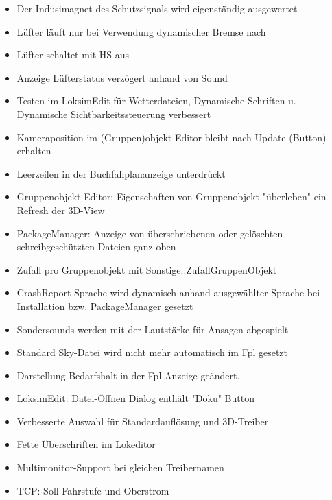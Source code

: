 \begin{itemize}
\itemsep1pt\parskip0pt
\item
  Der Indusimagnet des Schutzsignals wird eigenständig ausgewertet
\item
  Lüfter läuft nur bei Verwendung dynamischer Bremse nach
\item
  Lüfter schaltet mit HS aus
\item
  Anzeige Lüfterstatus verzögert anhand von Sound
\item
  Testen im LoksimEdit für Wetterdateien, Dynamische Schriften u.
  Dynamische Sichtbarkeitssteuerung verbessert
\item
  Kameraposition im (Gruppen)objekt-Editor bleibt nach Update-(Button)
  erhalten
\item
  Leerzeilen in der Buchfahplananzeige unterdrückt
\item
  Gruppenobjekt-Editor: Eigenschaften von Gruppenobjekt "überleben" ein
  Refresh der 3D-View
\item
  PackageManager: Anzeige von überschriebenen oder gelöschten
  schreibgeschützten Dateien ganz oben
\item
  Zufall pro Gruppenobjekt mit Sonstige::ZufallGruppenObjekt
\item
  CrashReport Sprache wird dynamisch anhand ausgewählter Sprache bei
  Installation bzw. PackageManager gesetzt
\item
  Sondersounds werden mit der Lautstärke für Ansagen abgespielt
\item
  Standard Sky-Datei wird nicht mehr automatisch im Fpl gesetzt
\item
  Darstellung Bedarfshalt in der Fpl-Anzeige geändert.
\item
  LoksimEdit: Datei-Öffnen Dialog enthält "Doku" Button
\item
  Verbesserte Auswahl für Standardauflösung und 3D-Treiber
\item
  Fette Überschriften im Lokeditor
\item
  Multimonitor-Support bei gleichen Treibernamen
\item
  TCP: Soll-Fahrstufe und Oberstrom
\end{itemize}

